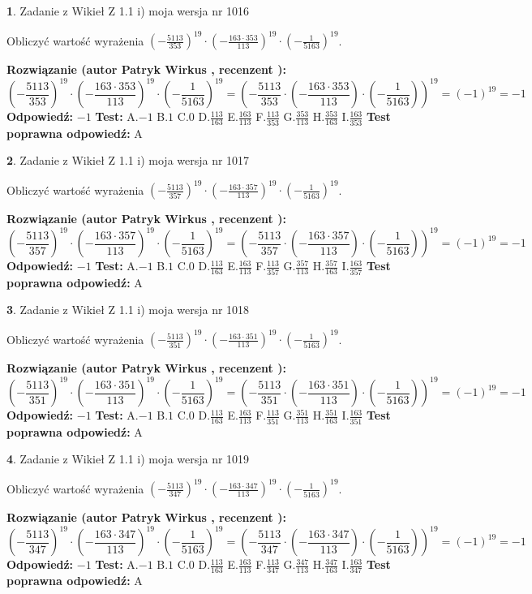 \documentclass[12pt, a4paper]{article}
\theoremstyle{definition} %
\newtheorem{zad}{}
\newcommand{\zadStart}[1]{\begin{zad}#1\newline}
\newcommand{\zadStop}{\end{zad}}
\newcommand{\rozwStart}[2]{\noindent \textbf{Rozwiązanie (autor #1 , recenzent #2): }\newline}
\newcommand{\rozwStop}{\newline}
\newcommand{\odpStart}{\noindent \textbf{Odpowiedź:}\newline}
\newcommand{\odpStop}{\newline}
\newcommand{\testStart}{\noindent \textbf{Test:}\newline}
\newcommand{\testStop}{\newline}
\newcommand{\kluczStart}{\noindent \textbf{Test poprawna odpowiedź:}\newline}
\newcommand{\kluczStop}{\newline}
\begin{document}
\zadStart{Zadanie z Wikieł Z 1.1 i) moja wersja nr 1016}

Obliczyć wartość wyrażenia $(-\frac{5113}{353})^{19} \cdot (-\frac{163 \cdot 353}{113})^{19} \cdot (-\frac{1}{5163})^{19}$.
\zadStop
\rozwStart{Patryk Wirkus}{}
$$(-\frac{5113}{353})^{19} \cdot (-\frac{163 \cdot 353}{113})^{19} \cdot (-\frac{1}{5163})^{19} = (-\frac{5113}{353} \cdot (-\frac{163 \cdot 353}{113}) \cdot (-\frac{1}{5163}))^{19} = (-1)^{19} = -1$$
\rozwStop
\odpStart
$-1$
\odpStop
\testStart
A.$-1$ B.$1$ C.$0$ D.$\frac{113}{163}$ E.$\frac{163}{113}$
F.$\frac{113}{353}$ G.$\frac{353}{113}$
H.$\frac{353}{163}$
I.$\frac{163}{353}$
\testStop
\kluczStart
A
\kluczStop



\zadStart{Zadanie z Wikieł Z 1.1 i) moja wersja nr 1017}

Obliczyć wartość wyrażenia $(-\frac{5113}{357})^{19} \cdot (-\frac{163 \cdot 357}{113})^{19} \cdot (-\frac{1}{5163})^{19}$.
\zadStop
\rozwStart{Patryk Wirkus}{}
$$(-\frac{5113}{357})^{19} \cdot (-\frac{163 \cdot 357}{113})^{19} \cdot (-\frac{1}{5163})^{19} = (-\frac{5113}{357} \cdot (-\frac{163 \cdot 357}{113}) \cdot (-\frac{1}{5163}))^{19} = (-1)^{19} = -1$$
\rozwStop
\odpStart
$-1$
\odpStop
\testStart
A.$-1$ B.$1$ C.$0$ D.$\frac{113}{163}$ E.$\frac{163}{113}$
F.$\frac{113}{357}$ G.$\frac{357}{113}$
H.$\frac{357}{163}$
I.$\frac{163}{357}$
\testStop
\kluczStart
A
\kluczStop



\zadStart{Zadanie z Wikieł Z 1.1 i) moja wersja nr 1018}

Obliczyć wartość wyrażenia $(-\frac{5113}{351})^{19} \cdot (-\frac{163 \cdot 351}{113})^{19} \cdot (-\frac{1}{5163})^{19}$.
\zadStop
\rozwStart{Patryk Wirkus}{}
$$(-\frac{5113}{351})^{19} \cdot (-\frac{163 \cdot 351}{113})^{19} \cdot (-\frac{1}{5163})^{19} = (-\frac{5113}{351} \cdot (-\frac{163 \cdot 351}{113}) \cdot (-\frac{1}{5163}))^{19} = (-1)^{19} = -1$$
\rozwStop
\odpStart
$-1$
\odpStop
\testStart
A.$-1$ B.$1$ C.$0$ D.$\frac{113}{163}$ E.$\frac{163}{113}$
F.$\frac{113}{351}$ G.$\frac{351}{113}$
H.$\frac{351}{163}$
I.$\frac{163}{351}$
\testStop
\kluczStart
A
\kluczStop



\zadStart{Zadanie z Wikieł Z 1.1 i) moja wersja nr 1019}

Obliczyć wartość wyrażenia $(-\frac{5113}{347})^{19} \cdot (-\frac{163 \cdot 347}{113})^{19} \cdot (-\frac{1}{5163})^{19}$.
\zadStop
\rozwStart{Patryk Wirkus}{}
$$(-\frac{5113}{347})^{19} \cdot (-\frac{163 \cdot 347}{113})^{19} \cdot (-\frac{1}{5163})^{19} = (-\frac{5113}{347} \cdot (-\frac{163 \cdot 347}{113}) \cdot (-\frac{1}{5163}))^{19} = (-1)^{19} = -1$$
\rozwStop
\odpStart
$-1$
\odpStop
\testStart
A.$-1$ B.$1$ C.$0$ D.$\frac{113}{163}$ E.$\frac{163}{113}$
F.$\frac{113}{347}$ G.$\frac{347}{113}$
H.$\frac{347}{163}$
I.$\frac{163}{347}$
\testStop
\kluczStart
A
\kluczStop
\end{document}
